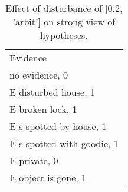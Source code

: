\begin{table}\begin{tabular}{l}\toprule\multirow{2}{*}{Evidence} \\\\\midrule
no evidence, 0 & \\E disturbed house, 1 & \\E broken lock, 1 & \\E s spotted by house, 1 & \\E s spotted with goodie, 1 & \\E private, 0 & \\E object is gone, 1 & \\\bottomrule\end{tabular}\caption{Effect of disturbance of [0.2, 'arbit'] on strong view of hypotheses.}\end{table}